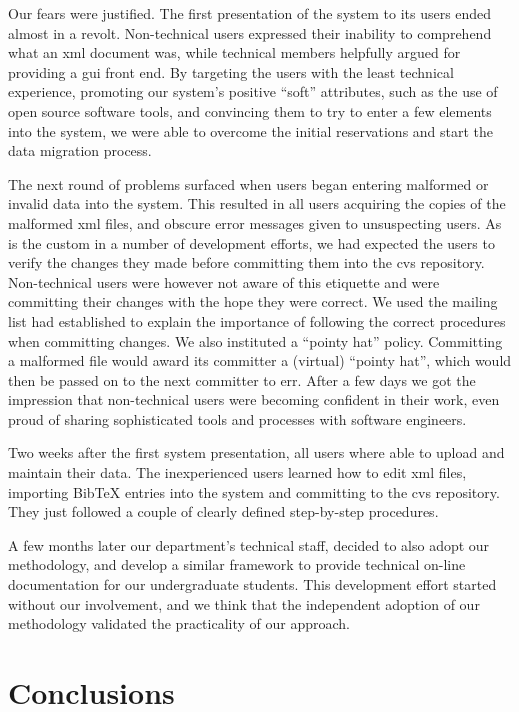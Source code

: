 \documentclass{article}
\begin{document}
Our fears were justified.
The first presentation of the system to its users ended
almost in a revolt.
Non-technical users expressed their inability to comprehend
what an {\sc xml} document was, while technical members
helpfully argued for providing a {\sc gui} front end.
By targeting the users with the least technical experience,
promoting our system's positive ``soft'' attributes,
such as the use of open source software tools,
and convincing them to try to enter a few elements into
the system, we were able to overcome the initial reservations
and start the data migration process.

The next round of problems surfaced when users began entering
malformed or invalid data into the system.
This resulted in all users acquiring the copies of the malformed
{\sc xml} files, and obscure error messages given to unsuspecting
users.
As is the custom in a number of development efforts, we had
expected the users to verify the changes they made before
committing them into the {\sc cvs} repository.
Non-technical users were however not aware of this etiquette
and were committing their changes with the hope they were correct.
We used the mailing list had established to explain the
importance of following the correct procedures when committing changes.
We also instituted a ``pointy hat'' policy. Committing a malformed file would award 
its committer a (virtual) ``pointy hat'', which would then be passed on to the next committer to err.
After a few days we got the impression that non-technical users
were becoming confident in their work, even proud of sharing
sophisticated tools and processes with software engineers.

Two weeks after the first system presentation,
all users where able to upload and maintain their data.
The inexperienced users learned how to edit {\sc xml} files,
importing {\sc BibTeX} entries into the system and committing to the {\sc cvs} repository. 
They just followed a couple of clearly defined step-by-step procedures.

A few months later our department's technical staff, decided to also adopt our 
methodology, and develop a similar framework to provide technical on-line documentation for our undergraduate students.
This development effort started without our involvement, and we think that the
independent adoption of our methodology validated the practicality of our approach.

\section{Conclusions}
\label{sec:concl}
\end{document}

